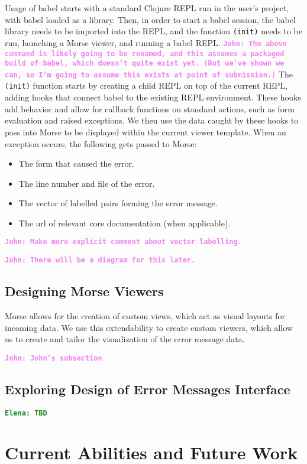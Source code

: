 \documentclass[12pt]{article}
\newcommand{\comment}[1]{{\bf \tt  {#1}}}
\newcommand{\emcomment}[1]{\textcolor{ForestGreen}{\comment{Elena: {#1}}}}
\newcommand{\jwcomment}[1]{\textcolor{violet}{\comment{John: {#1}}}}
\begin{document}
Usage of babel starts with a standard Clojure REPL run in the user's project, with babel loaded as a library.
Then, in order to start a babel session, the babel library needs to be imported into the REPL, and the function 
\texttt{(init)} needs to be run, launching a Morse viewer, and running a babel REPL.
\jwcomment{The above command is likely going to be renamed, and this assumes a packaged build of babel, which
doesn't quite exist yet. (But we've shown we can, so I'm going to assume this exists at point of submission.)}
The \texttt{(init)} function starts by creating a child REPL on top of the current REPL, adding hooks that connect babel to 
the existing REPL environment. 
These hooks add behavior and allow for callback functions on standard actions, such as form evaluation and raised exceptions.
We then use the data caught by these hooks to pass into Morse to be displayed within the current viewer template. 
When an exception occurs, the following gets passed to Morse:
\begin{itemize}
	\item{The form that caused the error.}
	\item{The line number and file of the error.}
	\item{The vector of labelled pairs forming the error message.}
	\item{The url of relevant core documentation (when applicable).}
\end{itemize}

\jwcomment{Make more explicit comment about vector labelling.}

\jwcomment{There will be a diagram for this later.}

\subsection{Designing Morse Viewers}\label{subsec:Morse-Viewers}
Morse allows for the creation of custom views, which act as visual layouts for incoming data. 
We use this extendability to create custom viewers, which allow us to create and tailor the visualization of the error message data.


\jwcomment{John's subsection}

\subsection{Exploring Design of Error Messages Interface}\label{subsec:interface}
\emcomment{TBD}

		
\section{Current Abilities and Future Work}\label{sec:conclusion}
\end{document}
